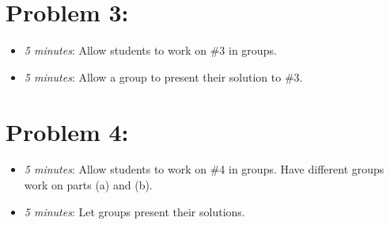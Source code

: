 \documentclass[handout,nooutcomes]{ximera}
\begin{document}
	
	
\section*{Problem 3:}

	\begin{itemize}
	
	\item  \emph{5 minutes}:  Allow students to work on \#3 in groups.  
	
	\item  \emph{5 minutes}:  Allow a group to present their solution to \#3.
	
	\end{itemize}
	


\section*{Problem 4:}

	\begin{itemize}
	
	\item  \emph{5 minutes}:  Allow students to work on \#4 in groups.  Have different groups work on parts (a) and (b).
		
	\item  \emph{5 minutes}:  Let groups present their solutions.
	
	\end{itemize}	
	
	
	

	
	

	
	
	

	
	
	
\end{document}

